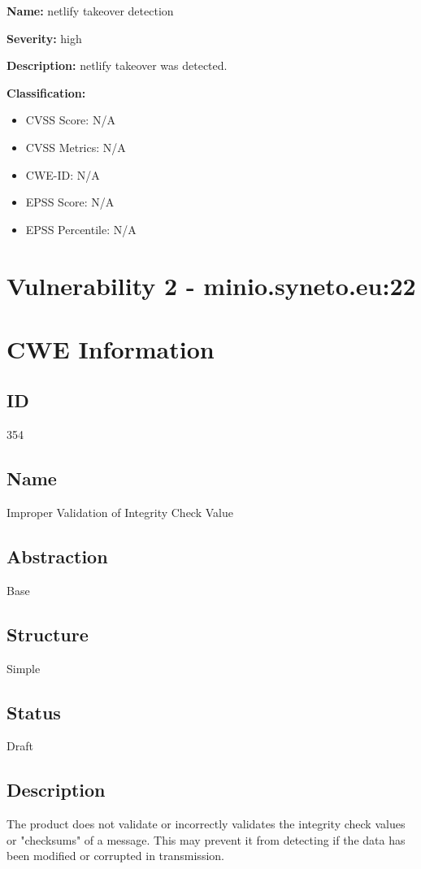\textbf{Name:} netlify takeover detection

\textbf{Severity:} high

\textbf{Description:} netlify takeover was detected.

\textbf{Classification:}
\begin{itemize}
\item CVSS Score: N/A
\item CVSS Metrics: N/A
\item CWE-ID: N/A
\item EPSS Score: N/A
\item EPSS Percentile: N/A
\end{itemize}



\section*{Vulnerability 2 - minio.syneto.eu:22}

\section*{CWE Information}
\subsection*{ID}
354

\subsection*{Name}
Improper Validation of Integrity Check Value

\subsection*{Abstraction}
Base

\subsection*{Structure}
Simple

\subsection*{Status}
Draft

\subsection*{Description}
The product does not validate or incorrectly validates the integrity check values or "checksums" of a message. This may prevent it from detecting if the data has been modified or corrupted in transmission.

